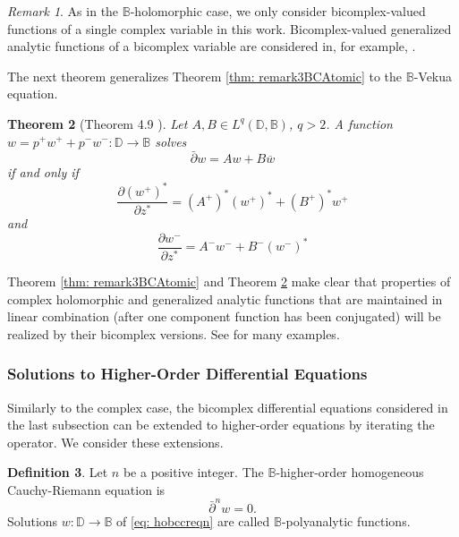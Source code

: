 \documentclass[12pt,reqno]{amsart}
\newtheorem{theorem}{Theorem}[section]
\theoremstyle{definition}
\newtheorem{deff}[theorem]{Definition}
\theoremstyle{remark}
\newtheorem{comm}[theorem]{Remark}
\newcommand{\p}{\partial}
\newcommand{\dbar}{\bar\partial}
\newcommand{\bc}{\mathbb{B}}
\newcommand{\disk}{\mathbb{D}}
\begin{document}
            \begin{comm}
                As in the $\bc$-holomorphic case, we only consider bicomplex-valued functions of a single complex variable in this work.  Bicomplex-valued generalized analytic functions of a bicomplex variable are considered in, for example, \cite{ BerglezBCPseudo, BerglezBCPseudo2}. 
            \end{comm}

            The next theorem generalizes Theorem \ref{thm: remark3BCAtomic} to the $\bc$-Vekua equation. 

            \begin{theorem}[Theorem 4.9 \cite{BCHoiv}]\label{thm: 4.9BCHoiv}
                Let $A, B \in L^q(\disk,\bc)$, $q>2$. A function $w = p^+ w^+ + p^- w^-: \disk\to\bc$ solves
                \[
                    \dbar w = Aw + B\overline{w}
                \]
                if and only if 
                \[
                    \frac{\p (w^+)^*}{\p z^*} = (A^+)^*(w^+)^* + (B^+)^* w^+
                \]
                and
                \[
                    \frac{\p w^-}{\p z^*} = A^- w^- + B^- (w^-)^*
                \]
            \end{theorem}

            Theorem \ref{thm: remark3BCAtomic} and Theorem \ref{thm: 4.9BCHoiv} make clear that properties of complex holomorphic and generalized analytic functions that are maintained in linear combination (after one component function has been conjugated) will be realized by their bicomplex versions. See \cite{BCAtomic, BCHoiv, BCHarmVek, BCBeltrami} for many examples.

         \subsubsection{Solutions to Higher-Order Differential Equations}

            Similarly to the complex case, the bicomplex differential equations considered in the last subsection can be extended to higher-order equations by iterating the operator. We consider these extensions. 

            \begin{deff}
                Let $n$ be a positive integer. The $\bc$-higher-order homogeneous Cauchy-Riemann equation is
                \begin{equation}\label{eq: hobccreqn}
                    \dbar^n w = 0.
                \end{equation}
                Solutions $w:\disk\to\bc$ of \eqref{eq: hobccreqn} are called $\bc$-polyanalytic functions.    
            \end{deff}
\end{document}
